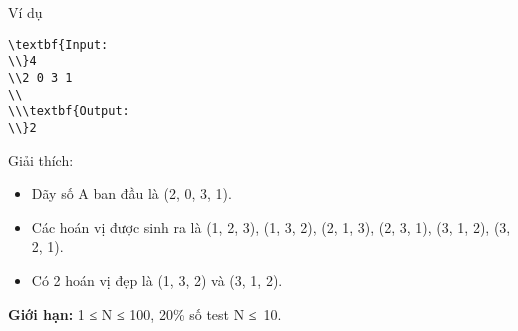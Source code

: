 Ví dụ
\begin{verbatim}
\textbf{Input:
\\}4
\\2 0 3 1
\\
\\\textbf{Output:
\\}2\end{verbatim}
Giải thích:
\begin{itemize}
	\item     Dãy số A ban đầu là (2, 0, 3, 1).   
	\item     Các hoán vị được sinh ra là (1, 2, 3), (1, 3, 2), (2, 1, 3), (2, 3, 1), (3, 1, 2), (3, 2, 1).   
	\item     Có 2 hoán vị đẹp là (1, 3, 2) và (3, 1, 2).   
\end{itemize}
\textbf{    Giới hạn:   }
1 ≤ N ≤ 100, 20\% số test N ≤ 10.